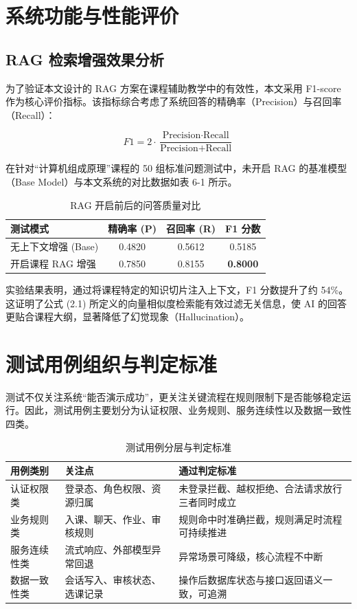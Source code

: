 \documentclass[12pt,a4paper,oneside]{ctexbook}
\numberwithin{equation}{chapter}
\begin{document}
\section{系统功能与性能评价}
\subsection{RAG 检索增强效果分析}
为了验证本文设计的 RAG 方案在课程辅助教学中的有效性，本文采用 F1-score 作为核心评价指标。该指标综合考虑了系统回答的精确率（Precision）与召回率（Recall）：

\begin{equation}
F1 = 2 \cdot \frac{\text{Precision} \cdot \text{Recall}}{\text{Precision} + \text{Recall}}
\end{equation}

在针对“计算机组成原理”课程的 50 组标准问题测试中，未开启 RAG 的基准模型（Base Model）与本文系统的对比数据如表 6-1 所示。

\begin{table}[H]
\centering
\caption{RAG 开启前后的问答质量对比}
\begin{tabular}{lccc}
\toprule
测试模式 & 精确率 (P) & 召回率 (R) & F1 分数 \\
\midrule
无上下文增强 (Base) & 0.4820 & 0.5612 & 0.5185 \\
开启课程 RAG 增强 & 0.7850 & 0.8155 & \textbf{0.8000} \\
\bottomrule
\end{tabular}
\end{table}

实验结果表明，通过将课程特定的知识切片注入上下文，F1 分数提升了约 54\%。这证明了公式 (2.1) 所定义的向量相似度检索能有效过滤无关信息，使 AI 的回答更贴合课程大纲，显著降低了幻觉现象（Hallucination）。

\section{测试用例组织与判定标准}

测试不仅关注系统“能否演示成功”，更关注关键流程在规则限制下是否能够稳定运行。因此，测试用例主要划分为认证权限、业务规则、服务连续性以及数据一致性四类。

\begin{table}[H]
  \centering
  \caption{测试用例分层与判定标准}
  \label{tab:testCriteria}
  \begin{tabular}{p{2.8cm}p{4.4cm}p{5.4cm}}
    \toprule
    用例类别 & 关注点 & 通过判定标准 \\
    \midrule
    认证权限类 & 登录态、角色权限、资源归属 & 未登录拦截、越权拒绝、合法请求放行三者同时成立 \\
    业务规则类 & 入课、聊天、作业、审核规则 & 规则命中时准确拦截，规则满足时流程可持续推进 \\
    服务连续性类 & 流式响应、外部模型异常回退 & 异常场景可降级，核心流程不中断 \\
    数据一致性类 & 会话写入、审核状态、选课记录 & 操作后数据库状态与接口返回语义一致，可追溯 \\
    \bottomrule
  \end{tabular}
\end{table}
\end{document}
